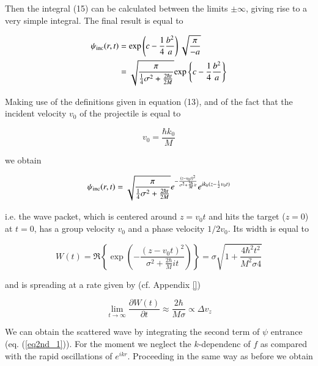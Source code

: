 \documentclass[a4paper,14pt]{book}
\begin{document}
\noindent Then the integral (15) can be calculated between the limits $\pm \infty$, giving rise to a very simple integral. The final result is equal to

\begin{equation}
\begin{split}
\psi_{\rm inc}(r,t) &= {\rm exp}\left( c - \frac{1}{4} \frac{b^2}{a} \right) \sqrt{\frac{\pi}{-a}} \\
&= \sqrt{\frac{\pi}{\frac{1}{4} \sigma^2 + \frac{2 \hbar t}{2M}}} {\rm exp} \left\{ c - \frac{1}{4} \frac{b^2}{a} \right\}
\end{split}
\end{equation}

\noindent Making use of the definitions given in equation (13), and of the fact that the incident velocity $v_0$ of the projectile is equal to

\begin{equation}
v_0 = \frac{\hbar k_0}{M}
\end{equation}

\noindent we obtain

\begin{equation}
\psi_{\rm inc}(r,t) = \sqrt{\frac{\pi}{\frac{1}{4} \sigma^2 + \frac{2 \hbar t}{2M}}} e^{- \frac{(z-v_0 t)^2}{\sigma^2 + \frac{2 \hbar}{M} i t}} e^{ik_0 (z - \frac{1}{2} v_0 t)}
\end{equation}

\noindent i.e. the wave packet, which is centered around $z=v_0 t$ and hits the target ($z=0$) at $t=0$, has a group velocity $v_0$ and a phase velocity $1/2 v_0$. Its width is equal to

\begin{equation}
W(t) = \Re \left\{ \exp \left(- \frac{(z-v_0 t)^2}{\sigma^2 + \frac{2 \hbar}{M} i t}\right) \right\} = \sigma \sqrt{1+ \frac{4 \hbar^2 t^2}{M^2 \sigma 4}}
\end{equation}

\noindent and is spreading at a rate given by (cf. Appendix \ref{})

\begin{equation}
\lim_{t \rightarrow \infty} \frac{\partial W(t)}{\partial t} \approx \frac{2 \hbar}{M \sigma} \propto \Delta v_z
\end{equation}

 We can obtain the scattered wave by integrating the second term of $\psi$ entrance (eq. (\ref{eq2nd_1})). For the moment we neglect the $k$-dependenc of $f$ as compared with the rapid oscillations of $e^{ikr}$. Proceeding in the same way as before we obtain
\end{document}
